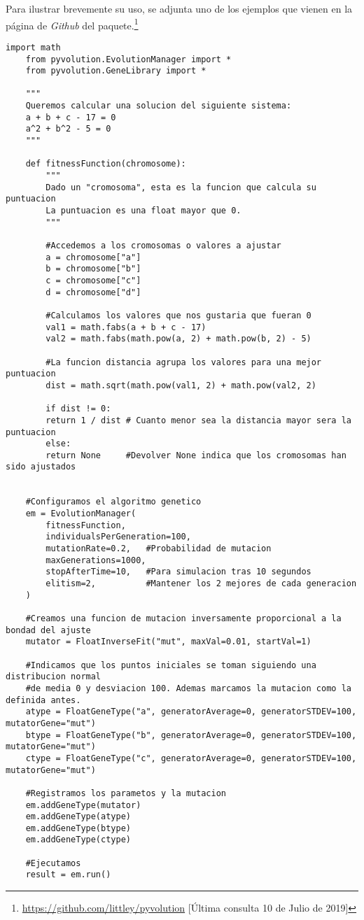 		Para ilustrar brevemente su uso, se adjunta uno de los ejemplos que vienen en la p\'agina de \textit{Github} del paquete.\footnote{\url{https://github.com/littley/pyvolution} [\'Ultima consulta 10 de Julio de 2019]}
		
		\begin{lstlisting}[basicstyle=\tiny]
	import math
	from pyvolution.EvolutionManager import *
	from pyvolution.GeneLibrary import *
	
	"""
	Queremos calcular una solucion del siguiente sistema:
	a + b + c - 17 = 0
	a^2 + b^2 - 5 = 0
	"""
		
	def fitnessFunction(chromosome):
		"""
		Dado un "cromosoma", esta es la funcion que calcula su puntuacion
		La puntuacion es una float mayor que 0.
		"""
		
		#Accedemos a los cromosomas o valores a ajustar
		a = chromosome["a"]
		b = chromosome["b"]
		c = chromosome["c"]
		d = chromosome["d"]
		
		#Calculamos los valores que nos gustaria que fueran 0
		val1 = math.fabs(a + b + c - 17)
		val2 = math.fabs(math.pow(a, 2) + math.pow(b, 2) - 5)
		
		#La funcion distancia agrupa los valores para una mejor puntuacion
		dist = math.sqrt(math.pow(val1, 2) + math.pow(val2, 2)
		
		if dist != 0:
		return 1 / dist # Cuanto menor sea la distancia mayor sera la puntuacion
		else:
		return None     #Devolver None indica que los cromosomas han sido ajustados
		
		
	#Configuramos el algoritmo genetico
	em = EvolutionManager(
		fitnessFunction,
		individualsPerGeneration=100,
		mutationRate=0.2,	#Probabilidad de mutacion
		maxGenerations=1000,
		stopAfterTime=10,   #Para simulacion tras 10 segundos
		elitism=2,          #Mantener los 2 mejores de cada generacion
	)
		
	#Creamos una funcion de mutacion inversamente proporcional a la bondad del ajuste
	mutator = FloatInverseFit("mut", maxVal=0.01, startVal=1)
		
	#Indicamos que los puntos iniciales se toman siguiendo una distribucion normal
	#de media 0 y desviacion 100. Ademas marcamos la mutacion como la definida antes.
	atype = FloatGeneType("a", generatorAverage=0, generatorSTDEV=100, mutatorGene="mut")
	btype = FloatGeneType("b", generatorAverage=0, generatorSTDEV=100, mutatorGene="mut")
	ctype = FloatGeneType("c", generatorAverage=0, generatorSTDEV=100, mutatorGene="mut")
		
	#Registramos los parametos y la mutacion
	em.addGeneType(mutator)
	em.addGeneType(atype)
	em.addGeneType(btype)
	em.addGeneType(ctype)
	
	#Ejecutamos	
	result = em.run()
		\end{lstlisting}

